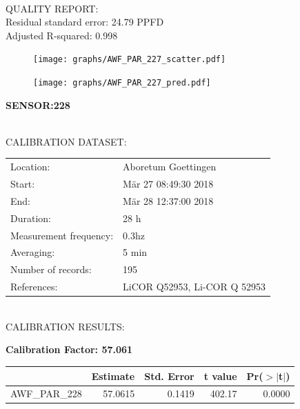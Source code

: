 \documentclass[oneside]{report}
\begin{document}
\hrulefill\\
QUALITY REPORT:\\
Residual standard error: 24.79 PPFD\\
Adjusted R-squared: 0.998



\begin{figure}[H]
  \centering
  \texttt{[image: graphs/AWF\_PAR\_227\_scatter.pdf]}
\end{figure}




\begin{figure}[H]
  \centering
  \texttt{[image: graphs/AWF\_PAR\_227\_pred.pdf]}
\end{figure}

\pagebreak


\begin{center}
\large{\textbf{SENSOR:228}}\\
\end{center}

\hrulefill\\
CALIBRATION DATASET:\\
\begin{table}[h!]
  \centering
  \label{tab:table1}
  \begin{tabular}{ll}
    Location: & Aboretum Goettingen\\ 
    
    
    Start:  & Mär 27 08:49:30 2018 \\
    End:   & Mär 28 12:37:00 2018\\ 
    Duration: & 28 h\\
    Measurement frequency: & 0.3hz\\
    Averaging:  &5 min\\
    Number of records: & 195 \\
    References: & LiCOR Q52953, Li-COR Q 52953 \\
  \end{tabular}
\end{table}

\hrulefill\\
CALIBRATION RESULTS:\\


\begin{center}
\textbf{\large{Calibration Factor: 57.061}}\\
\end{center}
\begin{table}[ht]
\centering
\begin{tabular}{rrrrr}
  \hline
 & Estimate & Std. Error & t value & Pr($>$$|$t$|$) \\ 
  \hline
AWF\_PAR\_228 & 57.0615 & 0.1419 & 402.17 & 0.0000 \\ 
   \hline
\end{tabular}
\end{table}
\end{document}
